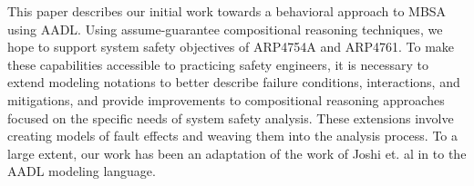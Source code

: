 This paper describes our initial work towards a behavioral approach to MBSA using AADL.  Using assume-guarantee compositional reasoning techniques, we hope to support system safety objectives of ARP4754A and ARP4761.  To make these capabilities accessible to practicing safety engineers, it is necessary to extend modeling notations to better describe failure conditions, interactions, and mitigations, and provide improvements to compositional reasoning approaches focused on the specific needs of system safety analysis.  These extensions involve creating models of fault effects and weaving them into the analysis process.  To a large extent, our work has been an adaptation of the work of Joshi et. al in \cite {Joshi05:Dasc,Joshi05:SafeComp,NasaRep:MBSA-Aug05} to the AADL modeling language.




